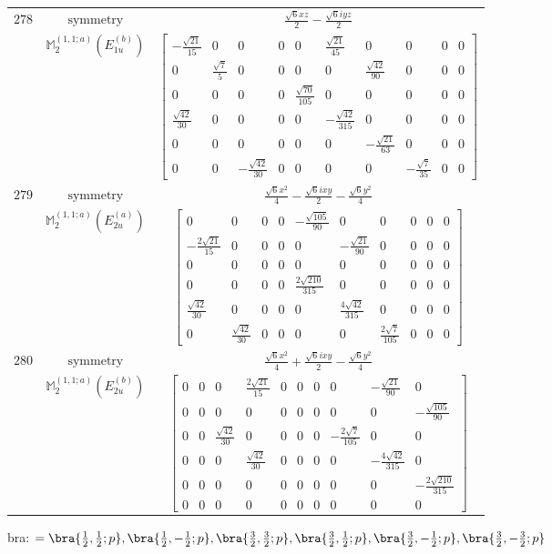 \documentclass[fleqn,8pt,landscape]{jsarticle}
\begin{document}
\begin{longtable}{ccc}
$ 278 $ & $ \text{symmetry} $ & $ \frac{\sqrt{6} x z}{2} - \frac{\sqrt{6} i y z}{2} $ \\
$  $ & $ \mathbb{M}_{2}^{(1,1;a)}(E_{1u}^{(b)}) $ & $ \begin{bmatrix} - \frac{\sqrt{21}}{15} & 0 & 0 & 0 & 0 & \frac{\sqrt{21}}{45} & 0 & 0 & 0 & 0 \\ 0 & \frac{\sqrt{7}}{5} & 0 & 0 & 0 & 0 & \frac{\sqrt{42}}{90} & 0 & 0 & 0 \\ 0 & 0 & 0 & 0 & \frac{\sqrt{70}}{105} & 0 & 0 & 0 & 0 & 0 \\ \frac{\sqrt{42}}{30} & 0 & 0 & 0 & 0 & - \frac{\sqrt{42}}{315} & 0 & 0 & 0 & 0 \\ 0 & 0 & 0 & 0 & 0 & 0 & - \frac{\sqrt{21}}{63} & 0 & 0 & 0 \\ 0 & 0 & - \frac{\sqrt{42}}{30} & 0 & 0 & 0 & 0 & - \frac{\sqrt{7}}{35} & 0 & 0 \end{bmatrix} $ \\ \hline
$ 279 $ & $ \text{symmetry} $ & $ \frac{\sqrt{6} x^{2}}{4} - \frac{\sqrt{6} i x y}{2} - \frac{\sqrt{6} y^{2}}{4} $ \\
$  $ & $ \mathbb{M}_{2}^{(1,1;a)}(E_{2u}^{(a)}) $ & $ \begin{bmatrix} 0 & 0 & 0 & 0 & - \frac{\sqrt{105}}{90} & 0 & 0 & 0 & 0 & 0 \\ - \frac{2 \sqrt{21}}{15} & 0 & 0 & 0 & 0 & - \frac{\sqrt{21}}{90} & 0 & 0 & 0 & 0 \\ 0 & 0 & 0 & 0 & 0 & 0 & 0 & 0 & 0 & 0 \\ 0 & 0 & 0 & 0 & \frac{2 \sqrt{210}}{315} & 0 & 0 & 0 & 0 & 0 \\ \frac{\sqrt{42}}{30} & 0 & 0 & 0 & 0 & \frac{4 \sqrt{42}}{315} & 0 & 0 & 0 & 0 \\ 0 & \frac{\sqrt{42}}{30} & 0 & 0 & 0 & 0 & \frac{2 \sqrt{7}}{105} & 0 & 0 & 0 \end{bmatrix} $ \\ \hline
$ 280 $ & $ \text{symmetry} $ & $ \frac{\sqrt{6} x^{2}}{4} + \frac{\sqrt{6} i x y}{2} - \frac{\sqrt{6} y^{2}}{4} $ \\
$  $ & $ \mathbb{M}_{2}^{(1,1;a)}(E_{2u}^{(b)}) $ & $ \begin{bmatrix} 0 & 0 & 0 & \frac{2 \sqrt{21}}{15} & 0 & 0 & 0 & 0 & - \frac{\sqrt{21}}{90} & 0 \\ 0 & 0 & 0 & 0 & 0 & 0 & 0 & 0 & 0 & - \frac{\sqrt{105}}{90} \\ 0 & 0 & \frac{\sqrt{42}}{30} & 0 & 0 & 0 & 0 & - \frac{2 \sqrt{7}}{105} & 0 & 0 \\ 0 & 0 & 0 & \frac{\sqrt{42}}{30} & 0 & 0 & 0 & 0 & - \frac{4 \sqrt{42}}{315} & 0 \\ 0 & 0 & 0 & 0 & 0 & 0 & 0 & 0 & 0 & - \frac{2 \sqrt{210}}{315} \\ 0 & 0 & 0 & 0 & 0 & 0 & 0 & 0 & 0 & 0 \end{bmatrix} $ \\ \hline
\end{longtable}
bra: $=\bra{\frac{1}{2},\frac{1}{2};p}, \bra{\frac{1}{2},- \frac{1}{2};p}, \bra{\frac{3}{2},\frac{3}{2};p}, \bra{\frac{3}{2},\frac{1}{2};p}, \bra{\frac{3}{2},- \frac{1}{2};p}, \bra{\frac{3}{2},- \frac{3}{2};p}$
\end{document}
